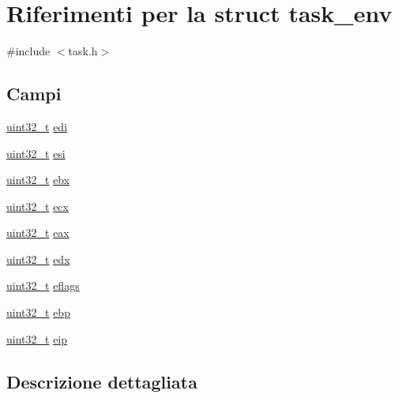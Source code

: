 \hypertarget{structtask__env}{\section{Riferimenti per la struct task\+\_\+env}
\label{structtask__env}
}


{\ttfamily \#include $<$task.\+h$>$}

\subsection*{Campi}
\begin{DoxyCompactItemize}
\item 
\hyperlink{aplus_8h_a53a0df51603c77c2aa5b9ea61b606a82}{uint32\+\_\+t} \hyperlink{structtask__env_afd28f73e49aab123e4c2a5f149f10fe2}{edi}
\item 
\hyperlink{aplus_8h_a53a0df51603c77c2aa5b9ea61b606a82}{uint32\+\_\+t} \hyperlink{structtask__env_a4bae98183ee224f67097a00d887a229b}{esi}
\item 
\hyperlink{aplus_8h_a53a0df51603c77c2aa5b9ea61b606a82}{uint32\+\_\+t} \hyperlink{structtask__env_a8594000ef53ff5bb74343e54648fd5e1}{ebx}
\item 
\hyperlink{aplus_8h_a53a0df51603c77c2aa5b9ea61b606a82}{uint32\+\_\+t} \hyperlink{structtask__env_a069a27e98e74717519066b7e73e9bc0e}{ecx}
\item 
\hyperlink{aplus_8h_a53a0df51603c77c2aa5b9ea61b606a82}{uint32\+\_\+t} \hyperlink{structtask__env_a617049724b4b79278b4fe107d9df7e3e}{eax}
\item 
\hyperlink{aplus_8h_a53a0df51603c77c2aa5b9ea61b606a82}{uint32\+\_\+t} \hyperlink{structtask__env_ab76a643115c795f2f9feb5582ea29497}{edx}
\item 
\hyperlink{aplus_8h_a53a0df51603c77c2aa5b9ea61b606a82}{uint32\+\_\+t} \hyperlink{structtask__env_a1eeaac73d44a6550af32a9dd726935e5}{eflags}
\item 
\hyperlink{aplus_8h_a53a0df51603c77c2aa5b9ea61b606a82}{uint32\+\_\+t} \hyperlink{structtask__env_a6630718bd69f6876f2ff74299316ae47}{ebp}
\item 
\hyperlink{aplus_8h_a53a0df51603c77c2aa5b9ea61b606a82}{uint32\+\_\+t} \hyperlink{structtask__env_ae6f3defc8a0fe9512785fdfd2eedd07d}{eip}
\end{DoxyCompactItemize}


\subsection{Descrizione dettagliata}


